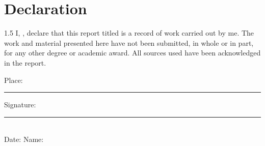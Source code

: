 \chapter*{Declaration}
\thispagestyle{plain}
\begin{spacing}{1.5}
I, \textbf{\StudentName}, declare that this report titled
\textbf{\ReportTitle} is a record of work carried out by me. The work and
material presented here have not been submitted, in whole or in part, for any
other degree or academic award. All sources used have been acknowledged in the
report.

\vspace{2cm}
\noindent Place: \rule{5cm}{0.4pt}\hfill Signature: \rule{4cm}{0.4pt}\\[1em]
Date: \SubmissionDate\hfill Name: \StudentName
\end{spacing}
\clearpage

